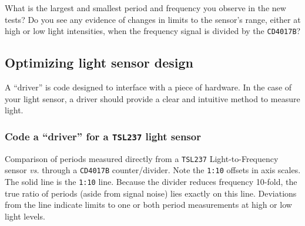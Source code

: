 \begin{enumerate}
	What is the largest and smallest period and frequency you observe in the new tests?
	Do you see any evidence of changes in limits to the sensor's range, either at high or low light intensities, when the frequency signal is divided by the \texttt{CD4017B}?
	
\end{enumerate}


\subsection{Optimizing light sensor design}
A ``driver'' is code designed to interface with a piece of hardware. 
In the case of your light sensor, a driver should provide a clear and intuitive method to measure light. 

\subsubsection{\howto Code a ``driver'' for a \texttt{TSL237} light sensor}



\begin{marginfigure}[-0cm]
	\begin{center}
		\caption[Periods from a light sensor and frequency divider]{Comparison of periods measured directly from a \texttt{TSL237} Light-to-Frequency sensor \textit{vs.} through a \texttt{CD4017B} counter/divider. 
		Note the \texttt{1:10} offsets in axis scales. 
		The solid line is the \texttt{1:10} line. 
		Because the divider reduces frequency 10-fold, the true ratio of periods (aside from signal noise) lies exactly on this line. 
		Deviations from the line indicate limits to one or both period measurements at high or low light levels.}
	\end{center}
\end{marginfigure}

